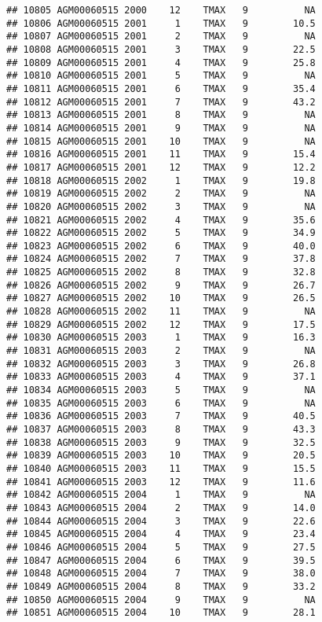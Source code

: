 \documentclass{article}\usepackage[]{graphicx}\usepackage[]{color}
\makeatletter
\newenvironment{kframe}{%
 \def\at@end@of@kframe{}%
 \ifinner\ifhmode%
  \def\at@end@of@kframe{\end{minipage}}%
  \begin{minipage}{\columnwidth}%
 \fi\fi%
 \def\FrameCommand##1{\hskip\@totalleftmargin \hskip-\fboxsep
 \colorbox{shadecolor}{##1}\hskip-\fboxsep
     \hskip-\linewidth \hskip-\@totalleftmargin \hskip\columnwidth}%
 \MakeFramed {\advance\hsize-\width
   \@totalleftmargin\z@ \linewidth\hsize
   \@setminipage}}%
 {\par\unskip\endMakeFramed%
 \at@end@of@kframe}
\newenvironment{knitrout}{}{} %
\makeatother
\begin{document}
\begin{knitrout}
\begin{kframe}
\begin{verbatim}
## 10805 AGM00060515 2000    12    TMAX   9          NA
## 10806 AGM00060515 2001     1    TMAX   9        10.5
## 10807 AGM00060515 2001     2    TMAX   9          NA
## 10808 AGM00060515 2001     3    TMAX   9        22.5
## 10809 AGM00060515 2001     4    TMAX   9        25.8
## 10810 AGM00060515 2001     5    TMAX   9          NA
## 10811 AGM00060515 2001     6    TMAX   9        35.4
## 10812 AGM00060515 2001     7    TMAX   9        43.2
## 10813 AGM00060515 2001     8    TMAX   9          NA
## 10814 AGM00060515 2001     9    TMAX   9          NA
## 10815 AGM00060515 2001    10    TMAX   9          NA
## 10816 AGM00060515 2001    11    TMAX   9        15.4
## 10817 AGM00060515 2001    12    TMAX   9        12.2
## 10818 AGM00060515 2002     1    TMAX   9        19.8
## 10819 AGM00060515 2002     2    TMAX   9          NA
## 10820 AGM00060515 2002     3    TMAX   9          NA
## 10821 AGM00060515 2002     4    TMAX   9        35.6
## 10822 AGM00060515 2002     5    TMAX   9        34.9
## 10823 AGM00060515 2002     6    TMAX   9        40.0
## 10824 AGM00060515 2002     7    TMAX   9        37.8
## 10825 AGM00060515 2002     8    TMAX   9        32.8
## 10826 AGM00060515 2002     9    TMAX   9        26.7
## 10827 AGM00060515 2002    10    TMAX   9        26.5
## 10828 AGM00060515 2002    11    TMAX   9          NA
## 10829 AGM00060515 2002    12    TMAX   9        17.5
## 10830 AGM00060515 2003     1    TMAX   9        16.3
## 10831 AGM00060515 2003     2    TMAX   9          NA
## 10832 AGM00060515 2003     3    TMAX   9        26.8
## 10833 AGM00060515 2003     4    TMAX   9        37.1
## 10834 AGM00060515 2003     5    TMAX   9          NA
## 10835 AGM00060515 2003     6    TMAX   9          NA
## 10836 AGM00060515 2003     7    TMAX   9        40.5
## 10837 AGM00060515 2003     8    TMAX   9        43.3
## 10838 AGM00060515 2003     9    TMAX   9        32.5
## 10839 AGM00060515 2003    10    TMAX   9        20.5
## 10840 AGM00060515 2003    11    TMAX   9        15.5
## 10841 AGM00060515 2003    12    TMAX   9        11.6
## 10842 AGM00060515 2004     1    TMAX   9          NA
## 10843 AGM00060515 2004     2    TMAX   9        14.0
## 10844 AGM00060515 2004     3    TMAX   9        22.6
## 10845 AGM00060515 2004     4    TMAX   9        23.4
## 10846 AGM00060515 2004     5    TMAX   9        27.5
## 10847 AGM00060515 2004     6    TMAX   9        39.5
## 10848 AGM00060515 2004     7    TMAX   9        38.0
## 10849 AGM00060515 2004     8    TMAX   9        33.2
## 10850 AGM00060515 2004     9    TMAX   9          NA
## 10851 AGM00060515 2004    10    TMAX   9        28.1

\end{verbatim}
\end{kframe}
\end{knitrout}
\end{document}
